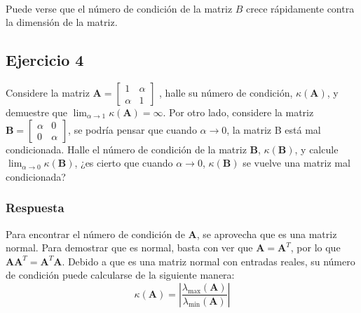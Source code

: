 \documentclass[11pt]{article}
\begin{document}
    \begin{center}
    \end{center}
    { \hspace*{\fill} \\}
    
    Puede verse que el número de condición de la matriz \(B\) crece
rápidamente contra la dimensión de la matriz.

    \hypertarget{ejercicio-4}{%
\subsection{Ejercicio 4}\label{ejercicio-4}}

Considere la matriz
\(\mathbf{A} = \begin{bmatrix}1 & \alpha \\ \alpha & 1\end{bmatrix}\) ,
halle su número de condición, \(\kappa(\mathbf{A})\), y demuestre que
\(\lim_{\alpha\rightarrow1}\kappa(\mathbf{A}) = \infty\). Por otro lado,
considere la matriz
\(\mathbf{B} = \begin{bmatrix} \alpha & 0\\ 0& \alpha\end{bmatrix}\), se
podría pensar que cuando \(\alpha\rightarrow0\), la matriz B está mal
condicionada. Halle el número de condición de la matriz \(\mathbf{B}\),
\(\kappa(\mathbf{B})\), y calcule
\(\lim_{\alpha\rightarrow0}\kappa(\mathbf{B})\), ¿es cierto que cuando
\(\alpha\rightarrow0\), \(\kappa(\mathbf{B})\) se vuelve una matriz mal
condicionada?

    \hypertarget{respuesta}{%
\subsubsection{Respuesta}\label{respuesta}}

Para encontrar el número de condición de \(\mathbf{A}\), se aprovecha
que es una matriz normal. Para demostrar que es normal, basta con ver
que \(\mathbf{A}= \mathbf{A}^T\), por lo que
\(\mathbf{A}\mathbf{A}^T = \mathbf{A}^T\mathbf{A}\). Debido a que es una
matriz normal con entradas reales, su número de condición puede
calcularse de la siguiente manera:
\[\kappa(\mathbf{A}) = \left|\frac{\lambda_{\max}(\mathbf{A})}{\lambda_{\min}(\mathbf{A})}\right|\]
\end{document}
